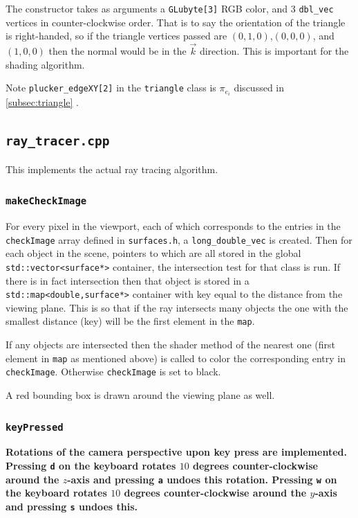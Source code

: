 \documentclass[12pt]{article}
\begin{document}
The constructor takes as arguments a \texttt{GLubyte[3]} RGB color, and 3 \texttt{dbl\_vec} vertices in counter-clockwise order. That is to say the orientation of the triangle is right-handed, so if the triangle vertices passed are $(0,1,0)$,$(0,0,0)$, and $(1,0,0)$ then the normal would be in the $\vec{k}$ direction. This is important for the shading algorithm.



Note \texttt{plucker\_edgeXY[2]} in the \texttt{triangle} class is $\pi_{e_i}$ discussed in \ref{subsec:triangle} . 

\subsection{\texttt{ray\_tracer.cpp}}

This implements the actual ray tracing algorithm.
\subsubsection{\texttt{makeCheckImage}}

For every pixel in the viewport, each of which corresponds to the entries in the \texttt{checkImage} array defined in \texttt{surfaces.h}, a \texttt{long\_double\_vec} is created. Then for each object in the scene, pointers to which are all stored in the global \texttt{std::vector<surface*>} container, the intersection test for that class is run. If there is in fact intersection then that object is stored in a \texttt{std::map<double,surface*>} container with key equal to the distance from the viewing plane. This is so that if the ray intersects many objects the one with the smallest distance (key) will be the first element in the \texttt{map}.

If any objects are intersected then the shader method of the nearest one (first element in \texttt{map} as mentioned above) is called to color the corresponding entry in \texttt{checkImage}. Otherwise \texttt{checkImage} is set to black.

A red bounding box is drawn around the viewing plane as well.

\subsubsection{\texttt{keyPressed}}
\textbf{Rotations of the camera perspective upon key press are implemented. Pressing \texttt{d} on the keyboard rotates $10$ degrees counter-clockwise around the $z$-axis and pressing \texttt{a} undoes this rotation. Pressing \texttt{w} on the keyboard rotates $10$ degrees counter-clockwise around the $y$-axis and pressing \texttt{s} undoes this.}
\end{document}
